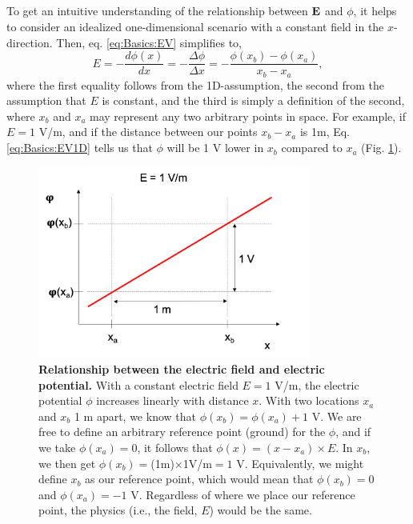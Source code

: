 \subsection{}
To get an intuitive understanding of the relationship between ${\bf E}$ and $\phi$, it helps to consider an idealized one-dimensional scenario with a constant field in the $x$-direction. Then, eq. \ref{eq:Basics:EV} simplifies to,
\begin{equation}
E = -\frac{d\phi(x)}{dx} = -\frac{\Delta \phi}{\Delta x} = -\frac{\phi(x_b)-\phi(x_a)}{x_b-x_a},
\label{eq:Basics:EV1D}
\end{equation}
where the first equality follows from the 1D-assumption, the second from the assumption that $E$ is constant, and the third is simply a definition of the second, where $x_b$ and $x_a$ may represent any two arbitrary points in space. For example, if $E = 1$ V/m, and if the distance between our points $x_b-x_a$ is 1m, Eq. \ref{eq:Basics:EV1D} tells us that $\phi$ will be 1 V  lower in $x_b$ compared to $x_a$ (Fig. \ref{fig:Basics:Ground}).

\begin{figure}[!ht]
\begin{center}
\includegraphics[width=0.8\textwidth]{Figures/Basics/Ground.png}
\end{center}
\caption{\textbf{Relationship between the electric field and electric potential.} With a constant electric field $E = 1$ V/m, the electric potential $\phi$ increases linearly with distance $x$. With two locations $x_a$ and $x_b$ 1 m apart, we know that $\phi(x_b) = \phi(x_a) + 1$ V. We are free to define an arbitrary reference point (ground) for the $\phi$, and if we take $\phi(x_a) = 0$, it follows that $\phi(x) = (x-x_a) \times E$. In $x_b$, we then get $\phi(x_b)=$(1m)$\times$1V/m$=1$ V. Equivalently, we might define $x_b$ as our reference point, which would mean that $\phi(x_b) = 0$ and $\phi(x_a) = -1$ V. Regardless of where we place our reference point, the physics (i.e., the field, $E$) would be the same.
}
\label{fig:Basics:Ground}
\end{figure}

